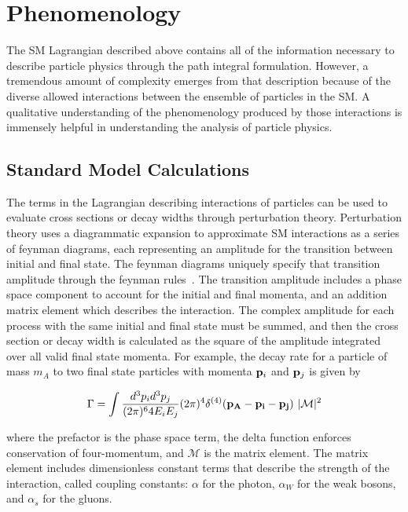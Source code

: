 \section{Phenomenology}

The \ac{SM} Lagrangian described above contains all of the information necessary to describe particle physics through the path integral formulation. 
However, a tremendous amount of complexity emerges from that description because of the diverse allowed interactions between the ensemble of particles in the \ac{SM}.
A qualitative understanding of the phenomenology produced by those interactions is immensely helpful in understanding the analysis of particle physics.

\subsection{Standard Model Calculations}
\label{sec:smcalc}

The terms in the Lagrangian describing interactions of particles can be used to evaluate cross sections or decay widths through perturbation theory.
Perturbation theory uses a diagrammatic expansion to approximate \ac{SM} interactions as a series of feynman diagrams, each representing an amplitude for the transition between initial and final state.
The feynman diagrams uniquely specify that transition amplitude through the feynman rules~\cite{peskin}.
The transition amplitude includes a phase space component to account for the initial and final momenta, and an addition matrix element which describes the interaction.
The complex amplitude for each process with the same initial and final state must be summed, and then the cross section or decay width is calculated as the square of the amplitude integrated over all valid final state momenta.
For example, the decay rate for a particle of mass $m_A$ to two final state particles with momenta $\mathbf{p}_i$ and $\mathbf{p}_j$ is given by

\begin{align*}
\Gamma = \int \frac{d^3p_i d^3 p_j}{(2\pi)^6 4E_i E_j} (2\pi)^4 \delta^{(4)}(\mathbf{p_A} - \mathbf{p_i} - \mathbf{p_j})\ |\mathcal{M}|^2 
\end{align*}

\noindent where the prefactor is the phase space term, the delta function enforces conservation of four-momentum, and $\mathcal{M}$ is the matrix element.
The matrix element includes dimensionless constant terms that describe the strength of the interaction, called coupling constants: $\alpha$ for the photon, $\alpha_W$ for the weak bosons, and $\alpha_s$ for the gluons.

